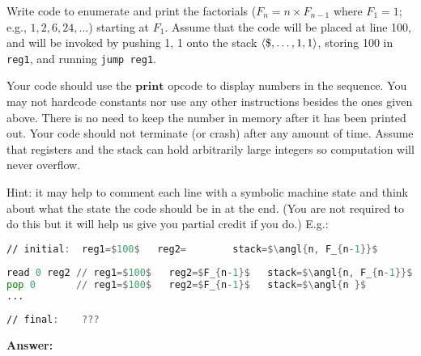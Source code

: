 \documentclass[11pt]{article}
\newcommand{\kw}[1]{\ensuremath{\mathbf{#1}}}
\DeclarePairedDelimiter\angl{\langle}{\rangle}
\begin{document}
\begin{enumerate}
\bigskip

Write code to enumerate and print the factorials ($F_n = n \times F_{n-1}$ where $F_1 = 1$; e.g., $1, 2, 6, 24, \ldots$) starting at $F_1$. Assume that the code will be placed at line 100, and will be invoked by pushing 1, 1 onto the stack $\angl{\$, \ldots, 1, 1}$, storing 100 in \lstinline[language=asm]{reg1}, and running \lstinline[language=asm]{jump reg1}.

Your code should use the \kw{print} opcode to display numbers in the sequence. You may not hardcode constants nor use any other instructions besides the ones given above. There is no need to keep the number in memory after it has been printed out.  Your code should not terminate (or crash) after any amount of time.  Assume that registers and the stack can hold arbitrarily large integers so computation will never overflow.

Hint: it may help to comment each line with a symbolic machine state and think about what the state the code should be in at the end.
(You are not required to do this but it will help us give you partial credit if you do.)
E.g.:

\begin{lstlisting}[language=asm, mathescape, numbers=none]
// initial:  reg1=$100$   reg2=        stack=$\angl{n, F_{n-1}}$
\end{lstlisting}
\begin{lstlisting}[language=asm, mathescape, firstnumber=100]
read 0 reg2 // reg1=$100$   reg2=$F_{n-1}$   stack=$\angl{n, F_{n-1}}$
pop 0       // reg1=$100$   reg2=$F_{n-1}$   stack=$\angl{n }$
...
\end{lstlisting}
\begin{lstlisting}[language=asm, mathescape, numbers=none]
// final:    ???
\end{lstlisting}

\newpage

\textbf{Answer:}

\end{enumerate}
\end{document}
